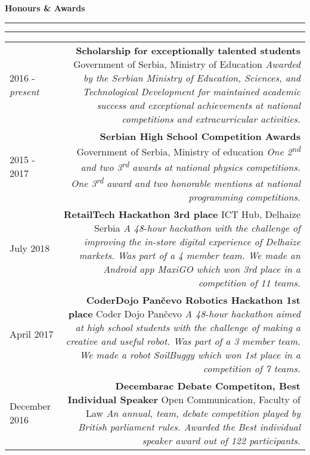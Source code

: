 \documentclass{article}
\newcommand{\mainitem}[3] {
    \textbf{#1}  \newline #2 \vskip5pt  \textit{#3} 
    \vspace{6pt}    %
}
\newenvironment{cvtable} {
	\hspace{-20pt} \begin{tabular}{L!{\color{line_color}\vrule width 1pt}D} %
} 
{\end{tabular}}
\renewcommand{\section}[1] {
    \vspace{15pt}   %
	{\color{main_color} \Large \textbf {#1}}
	{\color{line_color} \vskip-5pt \rule{\linewidth}{0.5mm}\hfill\vskip-11pt\rule{\linewidth}{0.2pt}}
	\vskip10pt  %
}
\begin{document}
    \section{\textbf{Honours \& Awards}}
    	\begin{cvtable}
    	    2016 - \textit{present} &
     	        \mainitem
     	            {Scholarship for exceptionally talented students}
     	            {Government of Serbia, Ministry of Education}
     	            {
                        Awarded by the Serbian Ministry of Education, Sciences, and Technological Development for maintained academic success and exceptional achievements at national competitions and extracurricular activities.
    				}
    		\\
            2015 - 2017 &
    			\mainitem
    			    {Serbian High School Competition Awards}
    			    {Government of Serbia, Ministry of education} 
    			    {
    				    One 2\textsuperscript{nd} and two 3\textsuperscript{rd} awards at national physics competitions. One 3\textsuperscript{rd} award and two honorable mentions at national programming competitions.
    			    } 
    		\\
     		July 2018 &
     	        \mainitem
     	            {RetailTech Hackathon 3rd place}
     	            {ICT Hub, Delhaize Serbia}
     	            {
    					A 48-hour hackathon with the challenge of improving the in-store digital experience of Delhaize markets.  Was part of a 4 member team. We made an Android app MaxiGO which won 3rd place in a competition of 11 teams.
    				}
    		\\
     		April 2017 &
     	        \mainitem
     	            {CoderDojo Pan\v cevo Robotics Hackathon 1st place}
     	            {Coder Dojo Pan\v cevo} 
     	            {
     	                A 48-hour hackathon aimed at high school students with the challenge of making a creative and useful robot.
    				    Was part of a 3 member team. We made a robot SoilBuggy which won 1st place in a competition of 7 teams.
    				} 
    		\\
            December 2016 &
     	        \mainitem
     	            {Decembarac Debate Competiton, Best Individual Speaker}
     	            {Open Communication, Faculty of Law} 
     	            {
    					An annual, team, debate competition played by British parliament rules. 
    					Awarded the Best individual speaker award out of 122 participants.
    				}
    	\end{cvtable}
    	
\end{document}
